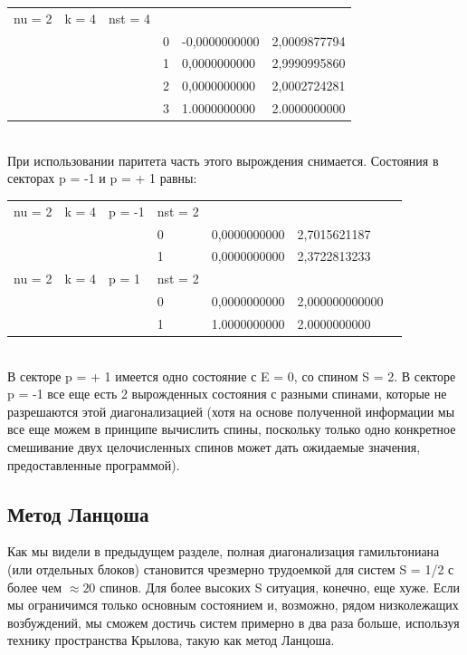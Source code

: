 \documentclass[11pt]{article}
\begin{document}
\begin{tabular}{llllll}
 	nu = 2 & k = 4 & nst = 4 & & & \\
    & & & 0 & -0,0000000000 & 2,0009877794 \\
    & & & 1 & 0,0000000000 & 2,9990995860 \\
    & & & 2 & 0,0000000000 & 2,0002724281 \\
    & & & 3 & 1.0000000000 & 2.0000000000 \\
\end{tabular}\\

При использовании паритета часть этого вырождения снимается. Состояния в секторах p = -1 и p = + 1 равны:\\

\begin{tabular}{lllllll}
	nu = 2 & k = 4 & p = -1 & nst = 2 & & & \\
    & & & 0 & 0,0000000000 & 2,7015621187 \\
    & & & 1 & 0,0000000000 & 2,3722813233 \\
	nu = 2 & k = 4 & p = 1 & nst = 2 & & & \\
    & & & 0 & 0,0000000000 & 2,000000000000 \\
    & & & 1 & 1.0000000000 & 2.0000000000 \\
\end{tabular}\\
    
    В секторе p = + 1 имеется одно состояние с E = 0, со спином S = 2. В секторе p = -1 все еще есть 2 вырожденных состояния с разными спинами, которые не разрешаются этой диагонализацией (хотя на основе полученной информации мы все еще можем в принципе вычислить спины, поскольку только одно конкретное смешивание двух целочисленных спинов может дать ожидаемые значения, предоставленные программой).
    
\subsection{Метод Ланцоша}
Как мы видели в предыдущем разделе, полная диагонализация гамильтониана (или отдельных блоков) становится чрезмерно трудоемкой для систем S = 1/2 с более чем $\approx 20$ спинов. Для более высоких S ситуация, конечно, еще хуже. Если мы ограничимся только основным состоянием и, возможно, рядом низколежащих возбуждений, мы сможем достичь систем примерно в два раза больше, используя технику пространства Крылова, такую как метод Ланцоша.
\end{document}
